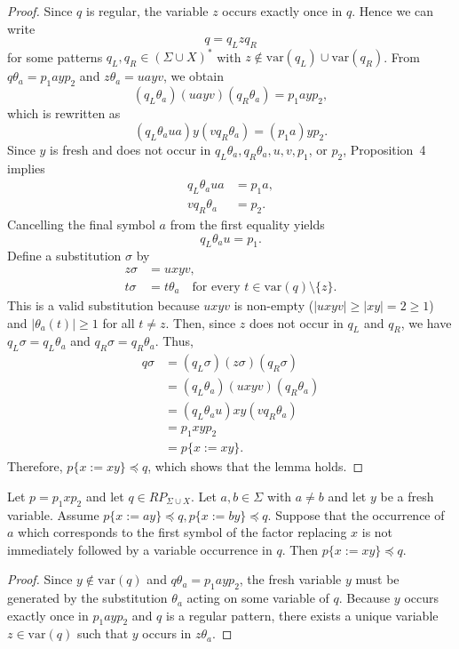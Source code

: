 {\begin{proof}
Since $q$ is regular, the variable $z$ occurs exactly once in $q$. Hence we can write
\[
q = q_L z q_R
\]
for some patterns $q_L, q_R \in (\Sigma \cup X)^*$ with $z \notin \mathrm{var}(q_L) \cup \mathrm{var}(q_R)$. From $q\theta_a = p_1 a y p_2$ and $z\theta_a = u a y v$, we obtain
\[
(q_L\theta_a)(u a y v)(q_R\theta_a) = p_1 a y p_2,
\]
which is rewritten as
\[
(q_L\theta_a u a) y (v q_R\theta_a) = (p_1 a) y p_2.
\]
Since $y$ is fresh and does not occur in $q_L\theta_a, q_R\theta_a, u, v, p_1$, or $p_2$, Proposition~4 implies
\begin{align}
q_L\theta_a u a &= p_1 a, \\
v q_R\theta_a &= p_2.
\end{align}
Cancelling the final symbol $a$ from the first equality yields
\[
q_L\theta_a u = p_1.
\]
Define a substitution $\sigma$ by
\begin{align*}
z\sigma &= u x y v, \\
t\sigma &= t\theta_a \quad \text{for every } t \in \mathrm{var}(q) \setminus \{z\}.
\end{align*}
This is a valid substitution because $u x y v$ is non-empty ($|u x y v| \ge |x y| = 2 \ge 1$) and $|\theta_a(t)| \ge 1$ for all $t \neq z$. Then, since $z$ does not occur in $q_L$ and $q_R$, we have $q_L\sigma = q_L\theta_a$ and $q_R\sigma = q_R\theta_a$. Thus,
\begin{align*}
q\sigma &= (q_L\sigma)(z\sigma)(q_R\sigma) \\
        &= (q_L\theta_a)(u x y v)(q_R\theta_a) \\
        &= (q_L\theta_a u) x y (v q_R\theta_a) \\
        &= p_1 x y p_2 \\
        &= p\{x := x y\}.
\end{align*}
Therefore, $p\{x := x y\} \preceq q$, which shows that the lemma holds.
\end{proof}

\begin{lem} \label{lem:boundary-extension} 
  Let $p=p_1xp_2$ and let $q\in RP_{\Sigma\cup X}$. Let $a,b\in\Sigma$ with $a\neq b$ and let $y$ be a fresh variable. 
  Assume $p\{x:=ay\}\preceq q, p\{x:=by\}\preceq q. $
  Suppose that the occurrence of $a$ which corresponds to the first symbol of the factor replacing $x$ is not immediately followed by a variable occurrence in $q$. 
  Then $p\{x:=xy\}\preceq q. $
\end{lem} 
\begin{proof} 
Since $y \notin \mathrm{var}(q)$ and $q\theta_a = p_1 a y p_2$, the fresh variable $y$ must be generated by the substitution $\theta_a$ acting on some variable of $q$.
Because $y$ occurs exactly once in $p_1 a y p_2$ and $q$ is a regular pattern, there exists a unique variable $z \in \mathrm{var}(q)$ such that $y$ occurs in $z\theta_a$.


\end{proof}}
